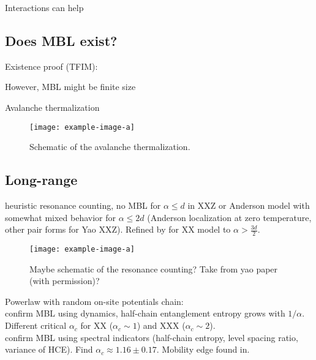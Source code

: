 Interactions can help\cite{huangInteractionenhancedManybodyLocalization2024}

\subsection{Does MBL exist?}
Existence proof (TFIM): \cite{imbrieManyBodyLocalizationQuantum2016}

However, MBL might be finite size

Avalanche thermalization

\begin{figure}[htb]
	\centering
	\texttt{[image: example-image-a]}
	\caption{Schematic of the avalanche thermalization.}
\end{figure}

\subsection{Long-range}

heuristic resonance counting, no MBL for $\alpha\leq d$ in XXZ \cite{yaoManyBodyLocalizationDipolar2014,burinManybodyDelocalizationStrongly2015,gutmanEnergyTransportAnderson2016} or Anderson model \cite{burinEnergyDelocalizationStrongly2006} with somewhat mixed behavior for $\alpha\leq 2d$ (Anderson localization at zero temperature, other pair forms for Yao XXZ). Refined by \cite{burinLocalizationRandomXY2015} for XX model to $\alpha > \frac{3d}{2}$.

\begin{figure}[htb]
	\centering
	\texttt{[image: example-image-a]}
	\caption{Maybe schematic of the resonance counting? Take from yao paper (with permission)?}
\end{figure}

Powerlaw with random on-site potentials chain:\\ \cite{safavi-nainiQuantumDynamicsDisordered2019} confirm MBL using dynamics, half-chain entanglement entropy grows with $1/\alpha$. Different critical $\alpha_c$ for XX ($\alpha_c\sim1$) and XXX ($\alpha_c\sim2$). \\
\cite{schifferManybodyLocalizationSpin2019} confirm MBL using spectral indicators (half-chain entropy, level spacing ratio, variance of HCE). Find $\alpha_c \approx 1.16\pm0.17$. Mobility edge found in\cite{yousefjaniMobilityEdgeLongrange2023}.

